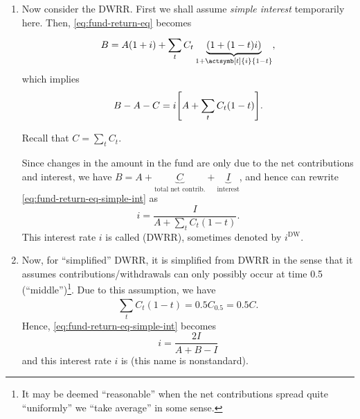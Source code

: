 \begin{enumerate}
\item \label{it:dwrr-fmla}
Now consider the DWRR. First we shall assume \emph{simple interest}
temporarily here. Then, \cref{eq:fund-return-eq} becomes
\[
B=A(1+i)+\sum_{t}^{}C_t\underbrace{(1+(1-t)i)}_{1+\actsymb[t]{i}{1-t}},
\]
which implies
\begin{equation}
\label{eq:fund-return-eq-simple-int}
B-A-C=i\qty[A+\sum_{t}^{}C_t(1-t)].
\end{equation}
\begin{note}
Recall that \(C=\sum_{t}^{}C_t\).
\end{note}

Since changes in the amount in the fund  are only due to the
net contributions and interest, we have \(B=A+\underbrace{C}_{\text{total net
contrib.}}+\underbrace{I}_{\text{interest}}\), and hence can rewrite
\cref{eq:fund-return-eq-simple-int} as
\[
i=\boxed{\frac{I}{A+\sum_{t}^{}C_t(1-t)}}.
\]
This interest rate \(i\) is called 
(DWRR), sometimes denoted by \(i^{\text{DW}}\).


\item \label{it:simplified-dwrr-fmla}
Now, for ``simplified'' DWRR, it is simplified from DWRR in the sense
that it assumes contributions/withdrawals can only possibly occur at time 0.5
(``middle'')\footnote{It may be deemed ``reasonable'' when the net
contributions spread quite ``uniformly''  we ``take
average'' in some sense.}. Due to this assumption, we have
\[
\sum_{t}^{}C_t(1-t)=0.5C_{0.5}=0.5C.
\]
Hence, \cref{eq:fund-return-eq-simple-int} becomes
\[
i=\boxed{\frac{2I}{A+B-I}}
\]
and this interest rate \(i\) is  (this name is nonstandard).


\end{enumerate}
